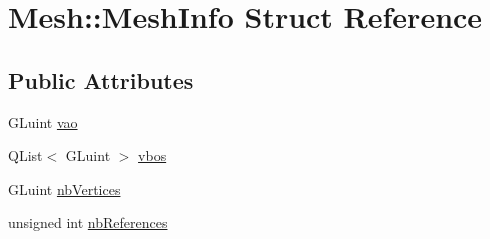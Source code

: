 \hypertarget{struct_mesh_1_1_mesh_info}{\section{Mesh\+:\+:Mesh\+Info Struct Reference}
\label{struct_mesh_1_1_mesh_info}
}
\subsection*{Public Attributes}
\begin{DoxyCompactItemize}
\item 
G\+Luint \hyperlink{struct_mesh_1_1_mesh_info_af15096e0f0aa61fff7d8a1c223e547cf}{vao}
\item 
Q\+List$<$ G\+Luint $>$ \hyperlink{struct_mesh_1_1_mesh_info_ad360b326ff7424dc9b6a3f6614af895d}{vbos}
\item 
G\+Luint \hyperlink{struct_mesh_1_1_mesh_info_a8869e5c769b3895876e32bed8252dffd}{nb\+Vertices}
\item 
unsigned int \hyperlink{struct_mesh_1_1_mesh_info_a8e32fc200e5ed8af32c409cac7b17342}{nb\+References}
\end{DoxyCompactItemize}


